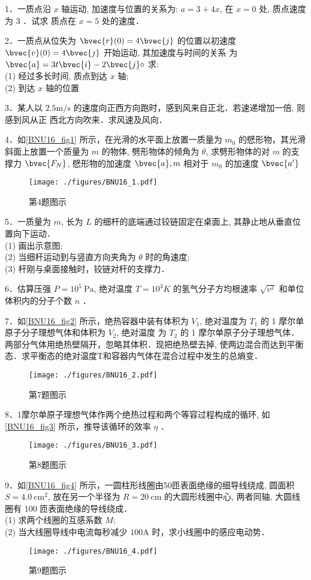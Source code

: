 
1．一质点沿 $x$ 轴运动, 加速度与位置的关系为: $a=3+4 x$, 在 $x=0$ 处, 质点速度为 3 ．试求 质点在 $x=5$ 处的速度．

2．一质点从位失为 $\bvec{r}(0)=4 \bvec{j}$ 的位置以初速度 $\bvec{v}(0)=4 \bvec{j}$ 开始运动, 其加速度与时间的关系 为 $\bvec{a}=3 t \bvec{i}-2 \bvec{j} \circ$ 求:\\
(1) 经过多长时间, 质点到达 $x$ 轴;\\
(2) 到达 $x$ 轴的位置

3．某人以 $2.5 \mathrm{m / s}$ 的速度向正西方向跑时，感到风来自正北．若速递增加一倍, 则感到风从正 西北方向吹来．求风速及风向．

4．如\autoref{BNU16_fig1} 所示，在光滑的水平面上放置一质量为 $m_{0}$ 的憵形物，其光滑斜面上放置一个质量为 $m$ 的物体, 劈形物体的倾角为 $\theta$, 求劈形物体的对 $m$ 的支撑力 $\bvec{F_{N}}$, 憵形物的加速度 $\bvec{a}, m$ 相对于 $m_{0}$ 的加速度 $\bvec{a^{\prime}}$
\begin{figure}[ht]
\centering
\texttt{[image: ./figures/BNU16\_1.pdf]}
\caption{第4题图示} \label{BNU16_fig1}
\end{figure}
5．一质量为 $m$, 长为 $L$ 的细杆的底端通过铰链固定在桌面上, 其静止地从垂直位置向下运动．\\
(1) 画出示意图;\\
(2) 当细杆运动到与竖直方向夹角为 $\theta$ 时的角速度;\\
(3) 杆刚与桌面接触时，铰链对杆的支撑力．

6．估算压强 $P=10^{5} \mathrm{~Pa}$, 绝对温度 $T=10^{3} K$ 的氢气分子方均根速率 $\sqrt{v^{2}}$ 和单位体积内的分子个数 $n$ ．

7．如\autoref{BNU16_fig2} 所示，绝热容器中装有体积为 $V_{1}$, 绝对温度为 $T_{1}$ 的 1 摩尔单原子分子理想气体和体积为 $V_{2}$, 绝对温度 为 $T_{2}$ 的 1 摩尔单原子分子理想气体．两部分气体用绝热壁隔开，忽略其体积．现把绝热壁去掉, 使两边混合而达到平衡态．求平衡态的绝对温度T和容器内气体在混合过程中发生的总熵变．
\begin{figure}[ht]
\centering
\texttt{[image: ./figures/BNU16\_2.pdf]}
\caption{第7题图示} \label{BNU16_fig2}
\end{figure}
8．1摩尔单原子理想气体作两个绝热过程和两个等容过程构成的循环, 如\autoref{BNU16_fig3} 所示，推导该循环的效率 $\eta$ ．
\begin{figure}[ht]
\centering
\texttt{[image: ./figures/BNU16\_3.pdf]}
\caption{第8题图示} \label{BNU16_fig3}
\end{figure}
9．如\autoref{BNU16_fig4} 所示，一圆柱形线圈由50匝表面绝缘的细导线绕成, 圆面积 $S=4.0 \mathrm{~cm}^{2}$, 放在另一个半径为 $R=20 \mathrm{~cm}$ 的大圆形线圈中心, 两者同轴, 大圆线圈有 100 匝表面绝缘的导线绕成．\\
(1) 求两个线圈的互感系数 $M$;\\
(2) 当大线圈导线中电流每秒减少 $100\mathrm{A}$ 时，求小线圈中的感应电动势．
\begin{figure}[ht]
\centering
\texttt{[image: ./figures/BNU16\_4.pdf]}
\caption{第9题图示} \label{BNU16_fig4}
\end{figure}

